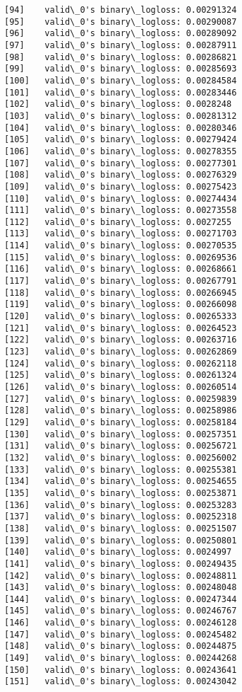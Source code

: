 \documentclass[11pt]{article}
\begin{document}
\begin{Verbatim}[commandchars=\\\{\}]
[94]	valid\_0's binary\_logloss: 0.00291324
[95]	valid\_0's binary\_logloss: 0.00290087
[96]	valid\_0's binary\_logloss: 0.00289092
[97]	valid\_0's binary\_logloss: 0.00287911
[98]	valid\_0's binary\_logloss: 0.00286821
[99]	valid\_0's binary\_logloss: 0.00285693
[100]	valid\_0's binary\_logloss: 0.00284584
[101]	valid\_0's binary\_logloss: 0.00283446
[102]	valid\_0's binary\_logloss: 0.0028248
[103]	valid\_0's binary\_logloss: 0.00281312
[104]	valid\_0's binary\_logloss: 0.00280346
[105]	valid\_0's binary\_logloss: 0.00279424
[106]	valid\_0's binary\_logloss: 0.00278355
[107]	valid\_0's binary\_logloss: 0.00277301
[108]	valid\_0's binary\_logloss: 0.00276329
[109]	valid\_0's binary\_logloss: 0.00275423
[110]	valid\_0's binary\_logloss: 0.00274434
[111]	valid\_0's binary\_logloss: 0.00273558
[112]	valid\_0's binary\_logloss: 0.0027255
[113]	valid\_0's binary\_logloss: 0.00271703
[114]	valid\_0's binary\_logloss: 0.00270535
[115]	valid\_0's binary\_logloss: 0.00269536
[116]	valid\_0's binary\_logloss: 0.00268661
[117]	valid\_0's binary\_logloss: 0.00267791
[118]	valid\_0's binary\_logloss: 0.00266945
[119]	valid\_0's binary\_logloss: 0.00266098
[120]	valid\_0's binary\_logloss: 0.00265333
[121]	valid\_0's binary\_logloss: 0.00264523
[122]	valid\_0's binary\_logloss: 0.00263716
[123]	valid\_0's binary\_logloss: 0.00262869
[124]	valid\_0's binary\_logloss: 0.00262118
[125]	valid\_0's binary\_logloss: 0.00261324
[126]	valid\_0's binary\_logloss: 0.00260514
[127]	valid\_0's binary\_logloss: 0.00259839
[128]	valid\_0's binary\_logloss: 0.00258986
[129]	valid\_0's binary\_logloss: 0.00258184
[130]	valid\_0's binary\_logloss: 0.00257351
[131]	valid\_0's binary\_logloss: 0.00256721
[132]	valid\_0's binary\_logloss: 0.00256002
[133]	valid\_0's binary\_logloss: 0.00255381
[134]	valid\_0's binary\_logloss: 0.00254655
[135]	valid\_0's binary\_logloss: 0.00253871
[136]	valid\_0's binary\_logloss: 0.00253283
[137]	valid\_0's binary\_logloss: 0.00252318
[138]	valid\_0's binary\_logloss: 0.00251507
[139]	valid\_0's binary\_logloss: 0.00250801
[140]	valid\_0's binary\_logloss: 0.0024997
[141]	valid\_0's binary\_logloss: 0.00249435
[142]	valid\_0's binary\_logloss: 0.00248811
[143]	valid\_0's binary\_logloss: 0.00248048
[144]	valid\_0's binary\_logloss: 0.00247344
[145]	valid\_0's binary\_logloss: 0.00246767
[146]	valid\_0's binary\_logloss: 0.00246128
[147]	valid\_0's binary\_logloss: 0.00245482
[148]	valid\_0's binary\_logloss: 0.00244875
[149]	valid\_0's binary\_logloss: 0.00244268
[150]	valid\_0's binary\_logloss: 0.00243641
[151]	valid\_0's binary\_logloss: 0.00243042

\end{Verbatim}
\end{document}
